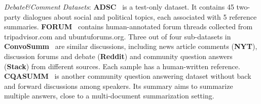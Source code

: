  \textit{Debate\&Comment Datasets}: \textbf{ADSC}~\cite{misra2015using} 
is a test-only dataset. It contains 45 two-party dialogues about social and political topics, each associated with 5 reference summaries. 
\textbf{FORUM}~\cite{tarnpradab2017toward} contains human-annotated forum threads collected from tripadvisor.com and ubuntuforums.org.
Three out of four sub-datasets in \textbf{ConvoSumm}~\cite{fabbri2021convosumm} 
are similar discussions, including news article comments (\textbf{NYT}), 
discussion forums and debate (\textbf{Reddit}) and community question answers 
(\textbf{Stack}) from different sources. Each sample has a human-written reference.
\textbf{CQASUMM}~\cite{chowdhury2019cqasumm} is another community question 
answering dataset without back and forward discussions among speakers. Its summary aims to summarize multiple answers, close to a multi-document summarization setting.



